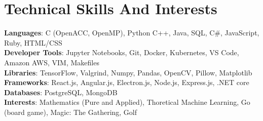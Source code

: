 \documentclass[letterpaper,10pt]{article}
\begin{document}
\section{Technical Skills And Interests}
\begin{itemize}[leftmargin=0.15in, label={}]
  \small{\item{
                \textbf{Languages}{: C (OpenACC, OpenMP), Python C++, Java, SQL, C\#, JavaScript, Ruby, HTML/CSS}\\
                \textbf{Developer Tools}{: Jupyter Notebooks, Git, Docker, Kubernetes, VS Code, Amazon AWS, VIM, Makefiles} \\
                \textbf{Libraries}{: TensorFlow, Valgrind, Numpy, Pandas, OpenCV, Pillow, Matplotlib}\\
                \textbf{Frameworks}{: React.js, Angular.js, Electron.js, Node.js, Express.js, .NET core} \\
                \textbf{Databases}{: PostgreSQL, MongoDB}\\
                \textbf{Interests}{: Mathematics (Pure and Applied), Thoretical Machine Learning, Go (board game), Magic: The Gathering, Golf\\
                }}}
\end{itemize}
\end{document}
